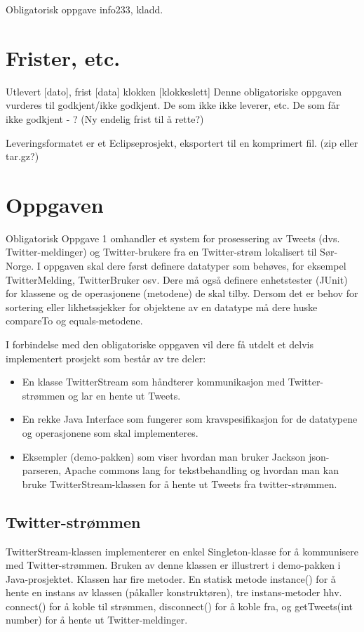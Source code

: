 \documentclass{article}
\begin{document}
Obligatorisk oppgave info233, kladd.

\section{Frister, etc.}
Utlevert [dato], frist [data] klokken [klokkeslett]
Denne obligatoriske oppgaven vurderes til godkjent/ikke godkjent.
De som ikke ikke leverer, etc.
De som får ikke godkjent - ? (Ny endelig frist til å rette?)

Leveringsformatet er et Eclipseprosjekt, eksportert til en komprimert fil. (zip eller tar.gz?)

\section{Oppgaven}

Obligatorisk Oppgave 1 omhandler et system for prosessering av Tweets (dvs. Twitter-meldinger) og Twitter-brukere fra en Twitter-strøm lokalisert til Sør-Norge. I oppgaven skal dere først definere datatyper som behøves, for eksempel TwitterMelding, TwitterBruker osv. Dere må også definere enhetstester (JUnit) for klassene og de operasjonene (metodene) de skal tilby. Dersom det er behov for sortering eller likhetssjekker for objektene av en datatype må dere huske compareTo og equals-metodene.


I forbindelse med den obligatoriske oppgaven vil dere få utdelt et delvis implementert prosjekt som består av tre deler:
\begin{itemize}
  \item En klasse TwitterStream som håndterer kommunikasjon med Twitter-strømmen og lar en hente ut Tweets.
  \item En rekke Java Interface som fungerer som kravspesifikasjon for de datatypene og operasjonene som skal implementeres.
  \item Eksempler (demo-pakken) som viser hvordan man bruker Jackson json-parseren, Apache commons lang for tekstbehandling og hvordan man kan bruke TwitterStream-klassen for å hente ut Tweets fra twitter-strømmen.
\end{itemize}

\subsection{Twitter-strømmen}
TwitterStream-klassen implementerer en enkel Singleton-klasse for å kommunisere med Twitter-strømmen. Bruken av denne klassen er illustrert i demo-pakken i Java-prosjektet. Klassen har fire metoder. En statisk metode instance() for å hente en instans av klassen (påkaller konstruktøren), tre instans-metoder hhv. connect() for å koble til strømmen, disconnect() for å koble fra, og getTweets(int number) for å hente ut Twitter-meldinger.
\end{document}
